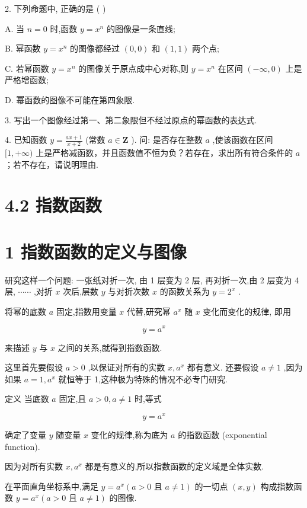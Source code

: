 \documentclass[10pt]{article}
\begin{document}
2. 下列命题中, 正确的是 ( )

A. 当 \(n = 0\) 时,函数 \(y = {x}^{n}\) 的图像是一条直线;

B. 幂函数 \(y = {x}^{n}\) 的图像都经过 \(\left( {0,0}\right)\) 和 \(\left( {1,1}\right)\) 两个点;

C. 若幂函数 \(y = {x}^{n}\) 的图像关于原点成中心对称,则 \(y = {x}^{n}\) 在区间 \(\left( {-\infty ,0}\right)\) 上是严格增函数;

D. 幂函数的图像不可能在第四象限.

3. 写出一个图像经过第一、第二象限但不经过原点的幂函数的表达式.

4. 已知函数 \(y = \frac{{ax} + 1}{x + 2}\) (常数 \(a \in  \mathbf{Z}\) ). 问: 是否存在整数 \(a\) ,使该函数在区间 \(\lbrack 1, + \infty )\) 上是严格减函数，并且函数值不恒为负？若存在，求出所有符合条件的 \(a\) ；若不存在，请说明理由.



\section*{4.2 指数函数}

\section*{1 指数函数的定义与图像}

研究这样一个问题: 一张纸对折一次, 由 1 层变为 2 层, 再对折一次,由 2 层变为 4 层, \(\cdots \cdots\) ,对折 \(x\) 次后,层数 \(y\) 与对折次数 \(x\) 的函数关系为 \(y = {2}^{x}\) .

将幂的底数 \(a\) 固定,指数用变量 \(x\) 代替,研究幂 \({a}^{x}\) 随 \(x\) 变化而变化的规律, 即用

\[
y = {a}^{x}
\]

来描述 \(y\) 与 \(x\) 之间的关系,就得到指数函数.

这里首先要假设 \(a > 0\) ,以保证对所有的实数 \(x,{a}^{x}\) 都有意义. 还要假设 \(a \neq  1\) ,因为如果 \(a = 1,{a}^{x}\) 就恒等于 1,这种极为特殊的情况不必专门研究.

定义 当底数 \(a\) 固定,且 \(a > 0,a \neq  1\) 时,等式

\[
y = {a}^{x}
\]

确定了变量 \(y\) 随变量 \(x\) 变化的规律,称为底为 \(a\) 的指数函数 (exponential function).

因为对所有实数 \(x,{a}^{x}\) 都是有意义的,所以指数函数的定义域是全体实数.

在平面直角坐标系中,满足 \(y = {a}^{x}\left( {a > 0\text{ 且 }a \neq  1}\right)\) 的一切点 \(\left( {x,y}\right)\) 构成指数函数 \(y = {a}^{x}\left( {a > 0\text{ 且 }a \neq  1}\right)\) 的图像.
\end{document}
